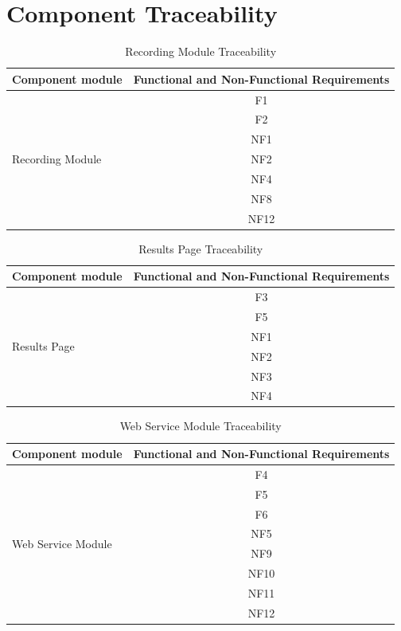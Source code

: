 \documentclass{article}
\begin{document}
\section{Component Traceability}

\begin{table}[H]
    \caption{Recording Module Traceability}
    \centering
    \begin{tabular}{|l|c|} \hline
        \textbf{Component module} & \textbf{Functional and Non-Functional Requirements} \\ \hline
         \multirow{7}{*}{Recording Module} & F1 \\ \cline{2-2}
         & F2 \\ \cline{2-2}
         & NF1 \\ \cline{2-2}
         & NF2 \\ \cline{2-2}
         & NF4 \\ \cline{2-2}
         & NF8 \\ \cline{2-2}
         & NF12 \\ \hline
    \end{tabular}
    \label{tab:Recording_Traceability}
\end{table}

\begin{table}[H]
    \caption{Results Page Traceability}
    \centering
    \begin{tabular}{|l|c|} \hline
        \textbf{Component module} & \textbf{Functional and Non-Functional Requirements} \\ \hline
         \multirow{6}{*}{Results Page} & F3 \\ \cline{2-2}
         & F5 \\ \cline{2-2}
         & NF1 \\ \cline{2-2}
         & NF2 \\ \cline{2-2}
         & NF3 \\ \cline{2-2}
         & NF4 \\ \hline
    \end{tabular}
    \label{tab:Results_Traceability}
\end{table}

\begin{table}[H]
    \caption{Web Service Module Traceability}
    \centering
    \begin{tabular}{|l|c|} \hline
        \textbf{Component module} & \textbf{Functional and Non-Functional Requirements} \\ \hline
         \multirow{8}{*}{Web Service Module} & F4 \\ \cline{2-2}
         & F5 \\ \cline{2-2}
         & F6 \\ \cline{2-2}
         & NF5 \\ \cline{2-2}
         & NF9 \\ \cline{2-2}
         & NF10 \\ \cline{2-2}
         & NF11 \\ \cline{2-2}
         & NF12 \\ \hline
    \end{tabular}
    \label{tab:Web_Service_Traceability}
\end{table}
\end{document}
